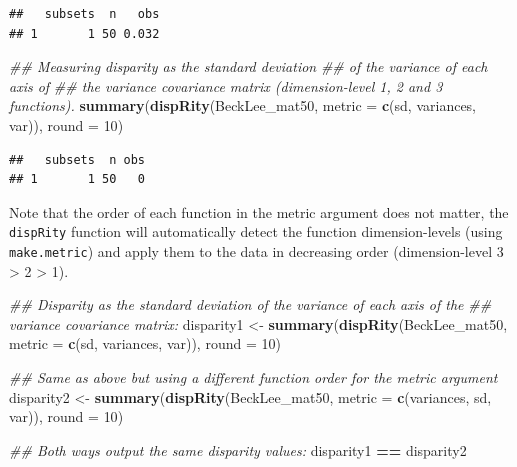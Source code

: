 \documentclass[]{book}
\newenvironment{Shaded}{\begin{snugshade}}{\end{snugshade}}
\newcommand{\CommentTok}[1]{\textcolor[rgb]{0.56,0.35,0.01}{\textit{#1}}}
\newcommand{\DataTypeTok}[1]{\textcolor[rgb]{0.13,0.29,0.53}{#1}}
\newcommand{\DecValTok}[1]{\textcolor[rgb]{0.00,0.00,0.81}{#1}}
\newcommand{\KeywordTok}[1]{\textcolor[rgb]{0.13,0.29,0.53}{\textbf{#1}}}
\newcommand{\NormalTok}[1]{#1}
\newcommand{\OperatorTok}[1]{\textcolor[rgb]{0.81,0.36,0.00}{\textbf{#1}}}
\newcommand{\StringTok}[1]{\textcolor[rgb]{0.31,0.60,0.02}{#1}}
\begin{document}
\begin{verbatim}
##   subsets  n   obs
## 1       1 50 0.032
\end{verbatim}

\begin{Shaded}
\begin{Highlighting}[]
\CommentTok{## Measuring disparity as the standard deviation}
\CommentTok{## of the variance of each axis of}
\CommentTok{## the variance covariance matrix (dimension-level 1, 2 and 3 functions).}
\KeywordTok{summary}\NormalTok{(}\KeywordTok{dispRity}\NormalTok{(BeckLee_mat50, }\DataTypeTok{metric =} \KeywordTok{c}\NormalTok{(sd, variances, var)), }\DataTypeTok{round =} \DecValTok{10}\NormalTok{)}
\end{Highlighting}
\end{Shaded}

\begin{verbatim}
##   subsets  n obs
## 1       1 50   0
\end{verbatim}

Note that the order of each function in the metric argument does not matter, the \texttt{dispRity} function will automatically detect the function dimension-levels (using \texttt{make.metric}) and apply them to the data in decreasing order (dimension-level 3 \textgreater{} 2 \textgreater{} 1).

\begin{Shaded}
\begin{Highlighting}[]
\CommentTok{## Disparity as the standard deviation of the variance of each axis of the}
\CommentTok{## variance covariance matrix:}
\NormalTok{disparity1 <-}\StringTok{ }\KeywordTok{summary}\NormalTok{(}\KeywordTok{dispRity}\NormalTok{(BeckLee_mat50,}
                               \DataTypeTok{metric =} \KeywordTok{c}\NormalTok{(sd, variances, var)),}
                      \DataTypeTok{round =} \DecValTok{10}\NormalTok{)}

\CommentTok{## Same as above but using a different function order for the metric argument}
\NormalTok{disparity2 <-}\StringTok{ }\KeywordTok{summary}\NormalTok{(}\KeywordTok{dispRity}\NormalTok{(BeckLee_mat50,}
                               \DataTypeTok{metric =} \KeywordTok{c}\NormalTok{(variances, sd, var)),}
                      \DataTypeTok{round =} \DecValTok{10}\NormalTok{)}

\CommentTok{## Both ways output the same disparity values:}
\NormalTok{disparity1 }\OperatorTok{==}\StringTok{ }\NormalTok{disparity2}
\end{Highlighting}
\end{Shaded}
\end{document}
